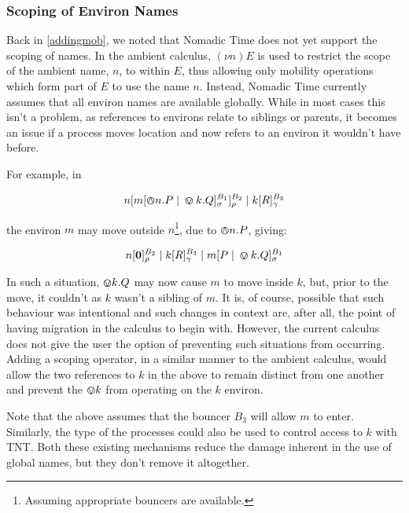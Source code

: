 \subsubsection{Scoping of Environ Names}

Back in \ref{addingmob}, we noted that Nomadic Time does not yet
support the scoping of names.  In the ambient calculus, $(\nu n)E$ is
used to restrict the scope of the ambient name, $n$, to within $E$,
thus allowing only mobility operations which form part of $E$ to use
the name $n$.  Instead, Nomadic Time currently assumes that all
environ names are available globally.  While in most cases this isn't
a problem, as references to environs relate to siblings or parents, it
becomes an issue if a process moves location and now refers to an
environ it wouldn't have before.

For example, in

\begin{equation}
{n}[ {m}[ \varowedge n.P \;|\; \varovee k.Q ]^{B_1}_{\sigma} ]^{B_2}_{\rho} \;|\; {k}[ R ]^{B_3}_{\gamma}
\end{equation}

\noindent the environ $m$ may move outside $n$\footnote{Assuming
  appropriate bouncers are available.}, due to $\varowedge n.P$, giving:

\begin{equation}
{n}[ \textbf{0} ]^{B_2}_{\rho} \;|\; {k}[ R ]^{B_3}_{\gamma} \;|\; {m}[ P \;|\; \varovee k.Q ]^{B_1}_{\sigma}
\end{equation}

\noindent In such a situation, $\varovee k.Q$ may now cause $m$ to move
inside $k$, but, prior to the move, it couldn't as $k$ wasn't a
sibling of $m$.  It is, of course, possible that such behaviour was
intentional and such changes in context are, after all, the point of
having migration in the calculus to begin with.  However, the current
calculus does not give the user the option of preventing such
situations from occurring.  Adding a scoping operator, in a similar
manner to the ambient calculus, would allow the two references to $k$
in the above to remain distinct from one another and prevent the
$\varovee k$ from operating on the $k$ environ.

Note that the above assumes that the bouncer $B_3$ will allow $m$ to
enter.  Similarly, the type of the processes could also be used to
control access to $k$ with TNT.  Both these existing mechanisms reduce
the damage inherent in the use of global names, but they don't remove
it altogether.

